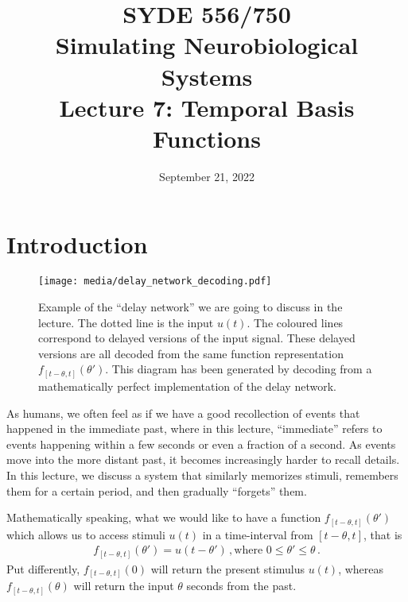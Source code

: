 \documentclass[10pt,letterpaper,oneside]{article}
\date{September 21, 2022}
\title{SYDE 556/750 \\ Simulating Neurobiological Systems \\ Lecture 7: Temporal Basis Functions}
\begin{document}

\section{Introduction}

\begin{figure}[h]
	\centering
	\texttt{[image: media/delay\_network\_decoding.pdf]}
	\caption{Example of the \enquote{delay network} we are going to discuss in the lecture. The dotted line is the input $u(t)$. The coloured lines correspond to delayed versions of the input signal. These delayed versions are all decoded from the same function representation $f_{[t - \theta, t]}(\theta')$. This diagram has been generated by decoding from a mathematically perfect implementation of the delay network. }
\end{figure}


As humans, we often feel as if we have a good recollection of events that happened in the immediate past, where in this lecture, \enquote{immediate} refers to events happening within a few seconds or even a fraction of a second. As events move into the more distant past, it becomes increasingly harder to recall details. In this lecture, we discuss a system that similarly memorizes stimuli, remembers them for a certain period, and then gradually \enquote{forgets} them.

Mathematically speaking, what we would like to have a function $f_{[t - \theta, t]}(\theta')$ which allows us to access stimuli $u(t)$ in a time-interval from $[t - \theta, t]$, that is
\begin{align*}
	f_{[t - \theta, t]}(\theta') = u\left(t - \theta' \right) \,, \text{where } 0 \leq \theta' \leq \theta \,.
\end{align*}
Put differently, $f_{[t - \theta, t]}(0)$ will return the present stimulus $u(t)$, whereas $f_{[t - \theta, t]}(\theta)$ will return the input $\theta$ seconds from the past.
\end{document}
